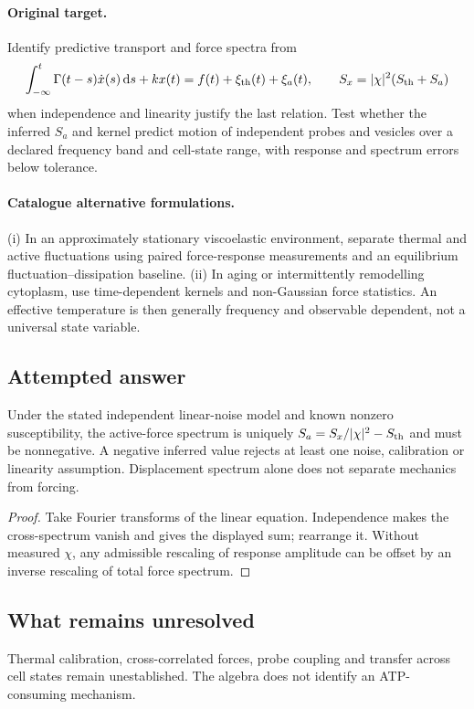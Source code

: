\documentclass[11pt]{article}
\begin{document}
\paragraph{Original target.}
Identify predictive transport and force spectra from
\[\int_{-\infty}^t\Gamma(t-s)\dot x(s)\,\mathrm{d} s+kx(t)=f(t)+\xi_{\rm th}(t)+\xi_a(t),\qquad S_x=|\chi|^2(S_{\rm th}+S_a)\]
when independence and linearity justify the last relation. Test whether the inferred $S_a$ and kernel predict motion of independent probes and vesicles over a declared frequency band and cell-state range, with response and spectrum errors below tolerance.
\paragraph{Catalogue alternative formulations.}
(i) In an approximately stationary viscoelastic environment, separate thermal and active fluctuations using paired force-response measurements and an equilibrium fluctuation--dissipation baseline. (ii) In aging or intermittently remodelling cytoplasm, use time-dependent kernels and non-Gaussian force statistics. An effective temperature is then generally frequency and observable dependent, not a universal state variable.
\subsection{Attempted answer}
\begin{proposition}
Under the stated independent linear-noise model and known nonzero susceptibility, the active-force spectrum is uniquely $S_a=S_x/|\chi|^2-S_{\rm th}$ and must be nonnegative. A negative inferred value rejects at least one noise, calibration or linearity assumption. Displacement spectrum alone does not separate mechanics from forcing.
\end{proposition}
\begin{proof}
Take Fourier transforms of the linear equation. Independence makes the cross-spectrum vanish and gives the displayed sum; rearrange it. Without measured $\chi$, any admissible rescaling of response amplitude can be offset by an inverse rescaling of total force spectrum.
\end{proof}
\subsection{What remains unresolved}
Thermal calibration, cross-correlated forces, probe coupling and transfer across cell states remain unestablished. The algebra does not identify an ATP-consuming mechanism.
\end{document}
